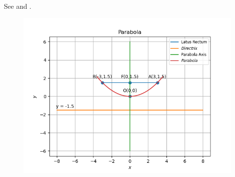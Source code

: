 See 
and
.
\begin{figure}[!h]
	\begin{center} 
	    \includegraphics[width=\columnwidth]{chapters/11/11/2/2/figs/parabola}
	\end{center}
\caption{}
\label{fig:chapters/11/11/2/2/Fig1}
\end{figure}




